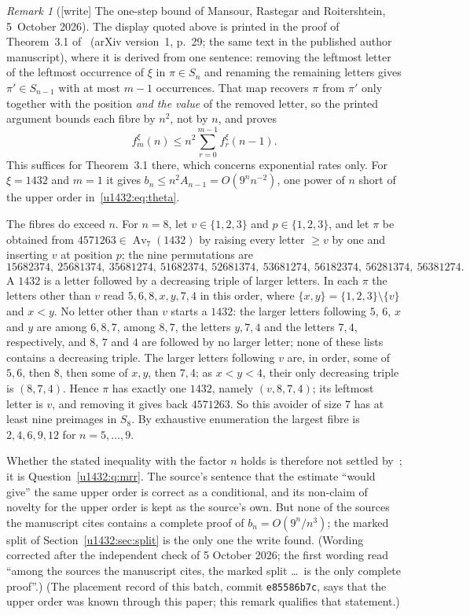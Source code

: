 \documentclass[11pt]{article}
\theoremstyle{remark}\newtheorem{remark}[theorem]{Remark}
\newcommand{\Av}{\operatorname{Av}}
\newcommand{\file}[1]{\nolinkurl{#1}}
\begin{document}
\begin{remark}[{[write]} The one-step bound of Mansour, Rastegar and Roitershtein, 5~October 2026]\label{u1432:rem:mrr}
The display quoted above is printed in the proof of Theorem~3.1
of~\cite{MRR} (arXiv version~1, p.~29; the same text in the published author
manuscript), where it is derived from one sentence: removing the leftmost
letter of the leftmost occurrence of $\xi$ in $\pi\in S_n$ and renaming the
remaining letters gives $\pi'\in S_{n-1}$ with at most $m-1$ occurrences.
That map recovers $\pi$ from $\pi'$ only together with the position \emph{and
the value} of the removed letter, so the printed argument bounds each fibre
by $n^2$, not by $n$, and proves
\[
 f_m^\xi(n)\le n^2\sum_{r=0}^{m-1}f_r^\xi(n-1).
\]
This suffices for Theorem~3.1 there, which concerns exponential rates only.
For $\xi=1432$ and $m=1$ it gives $b_n\le n^2A_{n-1}=O(9^nn^{-2})$, one
power of $n$ short of the upper order in~\eqref{u1432:eq:theta}.

The fibres do exceed $n$. For $n=8$, let $v\in\{1,2,3\}$ and
$p\in\{1,2,3\}$, and let $\pi$ be obtained from $4571263\in\Av_7(1432)$ by
raising every letter $\ge v$ by one and inserting $v$ at position $p$; the
nine permutations are
\[
 15682374,\ 25681374,\ 35681274,\ 51682374,\ 52681374,\ 53681274,\
 56182374,\ 56281374,\ 56381274 .
\]
A $1432$ is a letter followed by a decreasing triple of larger letters. In
each $\pi$ the letters other than $v$ read $5,6,8,x,y,7,4$ in this order,
where $\{x,y\}=\{1,2,3\}\setminus\{v\}$ and $x<y$. No letter other than $v$
starts a $1432$: the larger letters following $5$, $6$, $x$ and $y$ are
among $6,8,7$, among $8,7$, the letters $y,7,4$ and the letters $7,4$,
respectively, and $8$, $7$ and $4$ are followed by no larger letter; none of
these lists contains a decreasing triple. The larger letters following $v$
are, in order, some of $5,6$, then $8$, then some of $x,y$, then $7,4$; as
$x<y<4$, their only decreasing triple is $(8,7,4)$. Hence $\pi$ has exactly
one $1432$, namely $(v,8,7,4)$; its leftmost letter is $v$, and removing it
gives back $4571263$. So this
avoider of size $7$ has at least nine preimages in $S_8$. By exhaustive
enumeration the largest fibre is $2,4,6,9,12$ for $n=5,\dots,9$.

Whether the stated inequality with the factor $n$ holds is therefore not
settled by~\cite{MRR}; it is Question~\ref{u1432:q:mrr}. The source's
sentence that the estimate ``would give'' the same upper order is correct as
a conditional, and its non-claim of novelty for the upper order is kept as the
source's own. But none of the sources the manuscript cites contains a
complete proof of $b_n=O(9^n/n^3)$; the marked split of
Section~\ref{u1432:sec:split} is the only one the write found.
\textup{(Wording corrected after the independent check of 5 October 2026; the first wording read ``among the sources the manuscript cites, the marked split \dots\ is the only complete proof''.)} (The placement record of this batch,
commit \file{e85586b7c}, says that the upper order was known through this
paper; this remark qualifies that statement.)
\end{remark}
\end{document}
